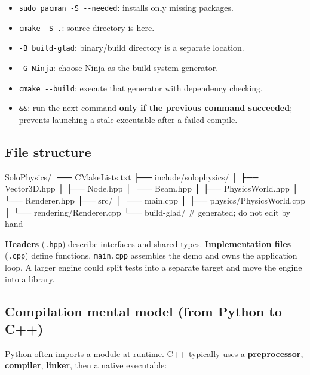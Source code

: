 \documentclass[
  10pt,
  a4paper,
]{article}
\newenvironment{Shaded}{\begin{snugshade}}{\end{snugshade}}
\newcommand{\NormalTok}[1]{#1}
\providecommand{\tightlist}{%
  \setlength{\itemsep}{0pt}\setlength{\parskip}{0pt}}
\begin{document}
\begin{itemize}
\tightlist
\item
  \texttt{sudo\ pacman\ -S\ -\/-needed}: installs only missing packages.
\item
  \texttt{cmake\ -S\ .}: source directory is here.
\item
  \texttt{-B\ build-glad}: binary/build directory is a separate
  location.
\item
  \texttt{-G\ Ninja}: choose Ninja as the build-system generator.
\item
  \texttt{cmake\ -\/-build}: execute that generator with dependency
  checking.
\item
  \texttt{\&\&}: run the next command \textbf{only if the previous
  command succeeded}; prevents launching a stale executable after a
  failed compile.
\end{itemize}

\subsection{File structure}\label{file-structure}

\begin{Shaded}
\begin{Highlighting}[]
\NormalTok{SoloPhysics/}
\NormalTok{├── CMakeLists.txt}
\NormalTok{├── include/solophysics/}
\NormalTok{│   ├── Vector3D.hpp}
\NormalTok{│   ├── Node.hpp}
\NormalTok{│   ├── Beam.hpp}
\NormalTok{│   ├── PhysicsWorld.hpp}
\NormalTok{│   └── Renderer.hpp}
\NormalTok{├── src/}
\NormalTok{│   ├── main.cpp}
\NormalTok{│   ├── physics/PhysicsWorld.cpp}
\NormalTok{│   └── rendering/Renderer.cpp}
\NormalTok{└── build{-}glad/       \# generated; do not edit by hand}
\end{Highlighting}
\end{Shaded}

\textbf{Headers} (\texttt{.hpp}) describe interfaces and shared types.
\textbf{Implementation files} (\texttt{.cpp}) define functions.
\texttt{main.cpp} assembles the demo and owns the application loop. A
larger engine could split tests into a separate target and move the
engine into a library.

\subsection{Compilation mental model (from Python to
C++)}\label{compilation-mental-model-from-python-to-c}

Python often imports a module at runtime. C++ typically uses a
\textbf{preprocessor}, \textbf{compiler}, \textbf{linker}, then a native
executable:
\end{document}
